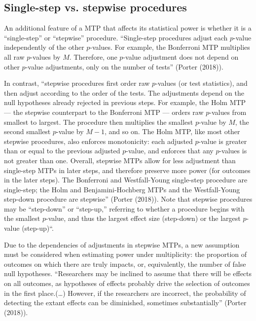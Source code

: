 \documentclass{article}
\begin{document}
\subsection{Single-step vs. stepwise procedures}
\label{sec:stepwise}

An additional feature of a MTP that affects its statistical power is
whether it is a ``single-step'' or ``stepwise'' procedure. ``Single-step
procedures adjust each \(p\)-value independently of the other
\(p\)-values. For example, the Bonferroni MTP multiplies all raw
\(p\)-values by \(M\). Therefore, one \(p\)-value adjustment does not
depend on other \(p\)-value adjustments, only on the number of tests''
(Porter (2018)).

In contrast, ``stepwise procedures first order raw \(p\)-values (or test
statistics), and then adjust according to the order of the tests. The
adjustments depend on the null hypotheses already rejected in previous
steps. For example, the Holm MTP --- the stepwise counterpart to the
Bonferroni MTP --- orders raw \(p\)-values from smallest to largest. The
procedure then multiplies the smallest \(p\)-value by \(M\), the second
smallest \(p\)-value by \(M-1\), and so on. The Holm MTP, like most
other stepwise procedures, also enforces monotonicity: each adjusted
\(p\)-value is greater than or equal to the previous adjusted
\(p\)-value, and enforces that any \(p\)-values is not greater than one.
Overall, stepwise MTPs allow for less adjustment than single-step MTPs
in later steps, and therefore preserve more power (for outcomes in the
later steps). The Bonferroni and Westfall-Young single-step procedure
are single-step; the Holm and Benjamini-Hochberg MTPs and the
Westfall-Young step-down procedure are stepwise'' (Porter (2018)). Note
that stepwise procedures may be ``step-down'' or ``step-up,'' referring
to whether a procedure begins with the smallest \(p\)-value, and thus
the largest effect size (step-down) or the largest \(p\)-value
(step-up)``.

Due to the dependencies of adjustments in stepwise MTPs, a new
assumption must be considered when estimating power under multiplicity:
the proportion of outcomes on which there are truly impacts, or,
equivalently, the number of false null hypotheses. ``Researchers may be
inclined to assume that there will be effects on all outcomes, as
hypotheses of effects probably drive the selection of outcomes in the
first place.(\ldots) However, if the researchers are incorrect, the
probability of detecting the extant effects can be diminished, sometimes
substantially'' (Porter (2018)).
\end{document}

